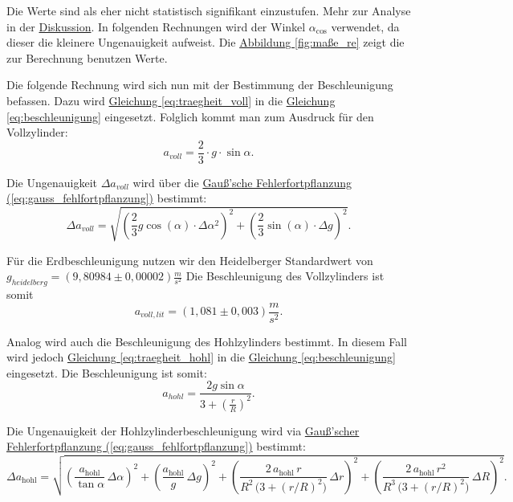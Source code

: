 Die Werte sind als eher nicht statistisch signifikant einzustufen. Mehr zur Analyse in der \hyperref[ch:diskussion]{Diskussion}. In folgenden Rechnungen wird der Winkel $\alpha_{\cos}$ verwendet, da dieser die kleinere Ungenauigkeit aufweist. Die \hyperref[fig:maße_re]{Abbildung \ref{fig:maße_re}} zeigt die zur Berechnung benutzen Werte.

Die folgende Rechnung wird sich nun mit der Bestimmung der Beschleunigung befassen. Dazu wird \hyperref[eq:traegheit_voll]{Gleichung \ref*{eq:traegheit_voll}} in die \hyperref[eq:beschleunigung]{Gleichung \ref*{eq:beschleunigung}} eingesetzt. Folglich kommt man zum Ausdruck für den Vollzylinder:
\begin{equation}
    a_{voll} = \frac{2}{3} \cdot g \cdot \sin \alpha.
\end{equation}

Die Ungenauigkeit $\Delta a_{voll}$ wird über die \hyperref[eq:gauss_fehlfortpflanzung]{Gauß'sche Fehlerfortpflanzung (\ref*{eq:gauss_fehlfortpflanzung})} bestimmt:
\begin{equation}
    \Delta a_{voll} = \sqrt{\left(\frac{2}{3} g \cos(\alpha) \cdot \Delta \alpha^2\right)^2 + \left(\frac{2}{3}\sin(\alpha) \cdot \Delta g\right)^2}.
\end{equation}

Für die Erdbeschleunigung nutzen wir den Heidelberger Standardwert von $g_{heidelberg} = (9,80984 \pm 0, 00002) \frac{m}{s^2}$ Die Beschleunigung des Vollzylinders ist somit
\begin{equation}
    \boxed{
        a_{voll,lit} = (1,081 \pm 0,003) \frac{m}{s^2}
    }.
    \label{eq:a_v_l}
\end{equation}

Analog wird auch die Beschleunigung des Hohlzylinders bestimmt. In diesem Fall wird jedoch \hyperref[eq:traegheit_hohl]{Gleichung \ref*{eq:traegheit_hohl}} in die \hyperref[eq:beschleunigung]{Gleichung \ref*{eq:beschleunigung}} eingesetzt. Die Beschleunigung ist somit:
\begin{equation}
    a_{hohl} = \frac{2g \sin \alpha}{3+\left(\frac{r}{R}\right)^2}.
    \label{eq:a_h}
\end{equation}

Die Ungenauigkeit der Hohlzylinderbeschleunigung wird via \hyperref[eq:gauss_fehlfortpflanzung]{Gauß'scher Fehlerfortpflanzung (\ref*{eq:gauss_fehlfortpflanzung})} bestimmt:
\begin{equation}
    \Delta a_{\mathrm{hohl}}
    = \sqrt{
    \left( \frac{a_{\mathrm{hohl}}}{\tan\alpha}\,\Delta\alpha \right)^{2}
    + \left( \frac{a_{\mathrm{hohl}}}{g}\,\Delta g \right)^{2}
    + \left( \frac{2\,a_{\mathrm{hohl}}\,r}{R^{2}\,\bigl(3+(r/R)^{2}\bigr)}\,\Delta r \right)^{2}
    + \left( \frac{2\,a_{\mathrm{hohl}}\,r^{2}}{R^{3}\,\bigl(3+(r/R)^{2}\bigr)}\,\Delta R \right)^{2}
    }.
\end{equation}

